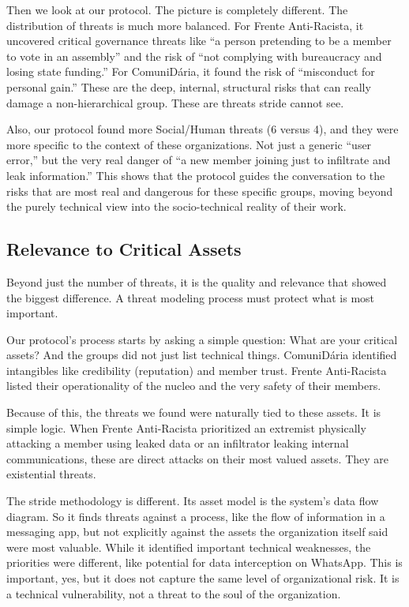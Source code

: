 Then we look at our protocol. The picture is completely different. The
distribution of threats is much more balanced. For Frente Anti-Racista, it
uncovered critical governance threats like “a person pretending to be a member
to vote in an assembly” and the risk of “not complying with bureaucracy and
losing state funding.” For ComuniDária, it found the risk of “misconduct for
personal gain.” These are the deep, internal, structural risks that can really
damage a non-hierarchical group. These are threats \gls{stride} cannot see.

Also, our protocol found more Social/Human threats (6 versus 4), and they were
more specific to the context of these organizations. Not just a generic “user
error,” but the very real danger of “a new member joining just to infiltrate and
leak information.” This shows that the protocol guides the conversation to the
risks that are most real and dangerous for these specific groups, moving beyond
the purely technical view into the socio-technical reality of their work.

\subsection{Relevance to Critical Assets}
\label{subsec:threat_quality_relevance}

Beyond just the number of threats, it is the quality and relevance that showed
the biggest difference. A threat modeling process must protect what is most
important.

Our protocol's process starts by asking a simple question: What are your
critical assets? And the groups did not just list technical things. ComuniDária
identified intangibles like credibility (reputation) and member trust.
Frente Anti-Racista listed their operationality of the nucleo and the very
safety of their members.

Because of this, the threats we found were naturally tied to these assets. It is
simple logic. When Frente Anti-Racista prioritized an extremist physically
attacking a member using leaked data or an infiltrator leaking internal
communications, these are direct attacks on their most valued assets. They are
existential threats.

The \gls{stride} methodology is different. Its asset model is the system’s data
flow diagram. So it finds threats against a process, like the flow of
information in a messaging app, but not explicitly against the assets the
organization itself said were most valuable. While it identified important
technical weaknesses, the priorities were different, like potential for data
interception on WhatsApp. This is important, yes, but it does not capture the
same level of organizational risk. It is a technical vulnerability, not a threat
to the soul of the organization.

